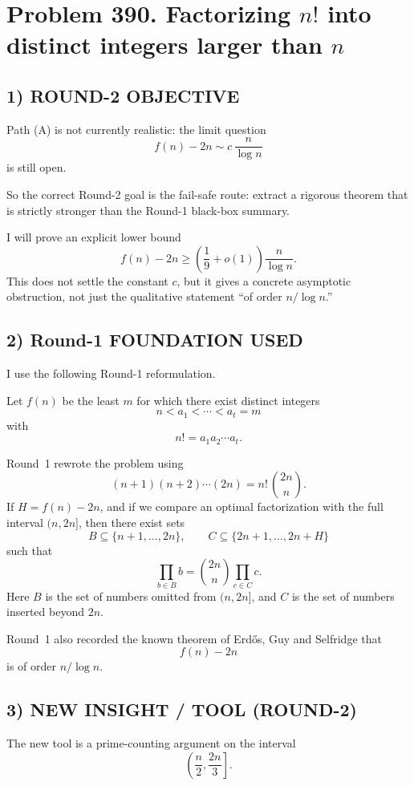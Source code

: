 \section*{Problem 390. Factorizing $n!$ into distinct integers larger than $n$}

\subsection*{1) ROUND-2 OBJECTIVE}

Path (A) is not currently realistic: the limit question
\[
f(n)-2n\sim c\,\frac{n}{\log n}
\]
is still open.

So the correct Round-2 goal is the fail-safe route: extract a rigorous theorem that is strictly stronger than the Round-1 black-box summary.

I will prove an explicit lower bound
\[
f(n)-2n\ge \left(\frac{1}{9}+o(1)\right)\frac{n}{\log n}.
\]
This does not settle the constant $c$, but it gives a concrete asymptotic obstruction, not just the qualitative statement ``of order $n/\log n$.''

\subsection*{2) Round-1 FOUNDATION USED}

I use the following Round-1 reformulation.

Let $f(n)$ be the least $m$ for which there exist distinct integers
\[
n<a_1<\cdots<a_t=m
\]
with
\[
n!=a_1a_2\cdots a_t.
\]

Round~1 rewrote the problem using
\[
(n+1)(n+2)\cdots(2n)=n!\,{2n\choose n}.
\]
If $H=f(n)-2n$, and if we compare an optimal factorization with the full interval $(n,2n]$, then there exist sets
\[
B\subseteq \{n+1,\dots,2n\},\qquad
C\subseteq \{2n+1,\dots,2n+H\}
\]
such that
\[
\prod_{b\in B} b={2n\choose n}\prod_{c\in C} c.
\]
Here $B$ is the set of numbers omitted from $(n,2n]$, and $C$ is the set of numbers inserted beyond $2n$.

Round~1 also recorded the known theorem of Erd\H{o}s, Guy and Selfridge that
\[
f(n)-2n
\]
is of order $n/\log n$.

\subsection*{3) NEW INSIGHT / TOOL (ROUND-2)}

The new tool is a prime-counting argument on the interval
\[
\left(\frac{n}{2},\frac{2n}{3}\right].
\]

